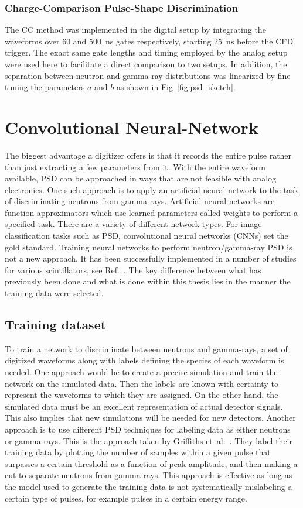 \documentclass[main.tex]{subfiles}
\begin{document}
\subsubsection{Charge-Comparison Pulse-Shape Discrimination}
The CC method was implemented in the digital setup by integrating the waveforms over 60 and \SI{500}{ns} gates respectively, starting \SI{25}{ns} before the CFD trigger. The exact same gate lengths and timing employed by the analog setup were used here to facilitate a direct comparison to two setups. In addition, the separation between neutron and gamma-ray distributions was linearized by fine tuning the parameters $a$ and $b$ as shown in Fig~\ref{fig:psd_sketch}.

\section{Convolutional Neural-Network}\label{sec:cnn}
The biggest advantage a digitizer offers is that it records the entire pulse rather than just extracting a few parameters from it. With the entire waveform available, PSD can be approached in ways that are not feasible with analog electronics. One such approach is to apply an artificial neural network to the task of discriminating neutrons from gamma-rays. 
Artificial neural networks are function approximators which use learned parameters called weights to perform a specified task. There are a variety of different network types. For image classification tasks such as PSD, convolutional neural networks (CNNs) set the gold standard. Training neural networks to perform neutron/gamma-ray PSD is not a new approach. It has been successfully implemented in a number of studies for various scintillators, see Ref.~\cite{Griffiths}. The key difference between what has previously been done and what is done within this thesis lies in the manner the training data were selected.

\subsection{Training dataset}
To train a network to discriminate between neutrons and gamma-rays, a set of digitized waveforms along with labels defining the species of each waveform is needed. One approach would be to create a precise simulation and train the network on the simulated data. Then the labels are known with certainty to represent the waveforms to which they are assigned. On the other hand, the simulated data must be an excellent representation of actual detector signals. This also implies that new simulations will be needed for new detectors. Another approach is to use different PSD techniques for labeling data as either neutrons or gamma-rays. This is the approach taken by  Griffiths et~al.~\cite{Griffiths}. They label their training data by plotting the number of samples within a given pulse that surpasses a certain threshold as a function of peak amplitude, and then making a cut to separate neutrons from gamma-rays. This approach is effective as long as the model used to generate the training data is not systematically mislabeling a certain type of pulses, for example pulses in a certain energy range. 
\end{document}
